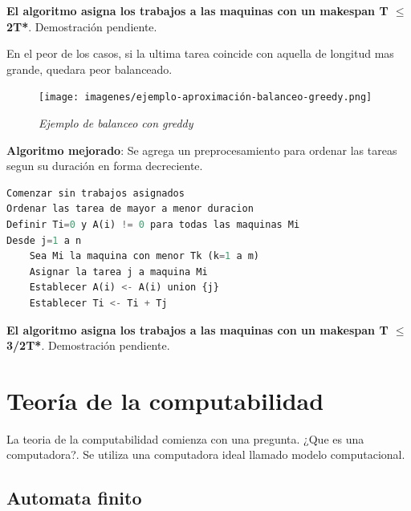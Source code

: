 \documentclass{article}
\begin{document}
\textbf{El algoritmo asigna los trabajos a las maquinas con un makespan T \(\leq\) 2T*}. Demostración pendiente.

En el peor de los casos, si la ultima tarea coincide con aquella de longitud mas grande, quedara
peor balanceado.

\begin{figure}[h!]
    \begin{center} 
    \texttt{[image: imagenes/ejemplo-aproximación-balanceo-greedy.png]}
    \caption{\small \sl Ejemplo de balanceo con greddy} 
    \end{center}
\end{figure}

\textbf{Algoritmo mejorado}: Se agrega un preprocesamiento para ordenar las tareas segun su duración 
en forma decreciente.

\begin{lstlisting}[language=Python, caption=Algoritmo de aproximación greedy mejorado]
Comenzar sin trabajos asignados
Ordenar las tarea de mayor a menor duracion
Definir Ti=0 y A(i) != 0 para todas las maquinas Mi
Desde j=1 a n
    Sea Mi la maquina con menor Tk (k=1 a m)
    Asignar la tarea j a maquina Mi
    Establecer A(i) <- A(i) union {j}
    Establecer Ti <- Ti + Tj

\end{lstlisting}    

\textbf{El algoritmo asigna los trabajos a las maquinas con un makespan T \(\leq\) 3/2T*}. Demostración pendiente.


\newpage
\section{Teoría de la computabilidad}
La teoria de la computabilidad comienza con una pregunta. ¿Que es una computadora?. Se utiliza una
computadora ideal llamado modelo computacional.

\subsection{Automata finito}
\end{document}
